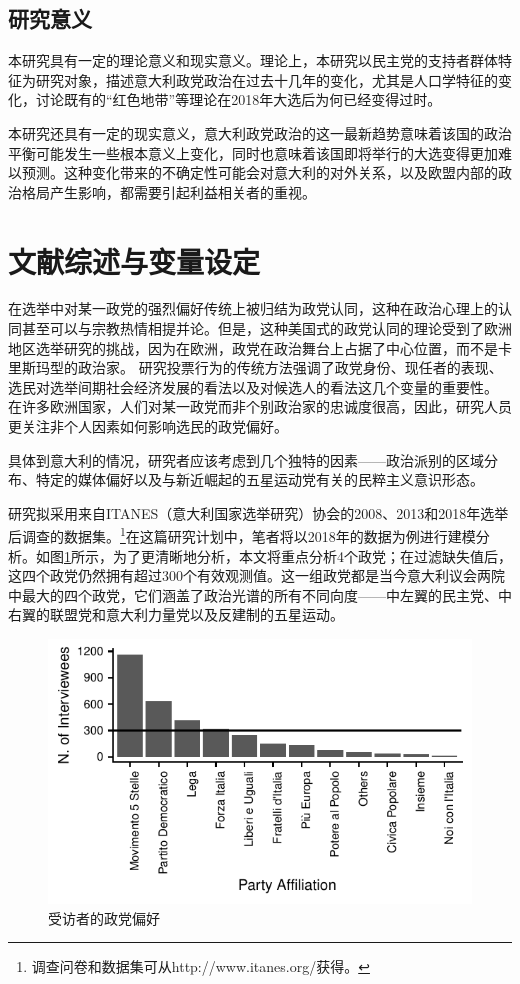 \documentclass[12pt,a4paper]{ctexart}
\begin{document}
    \subsection{研究意义}
    本研究具有一定的理论意义和现实意义。理论上，本研究以民主党的支持者群体特征为研究对象，描述意大利政党政治在过去十几年的变化，尤其是人口学特征的变化，讨论既有的``红色地带''等理论在2018年大选后为何已经变得过时。

    本研究还具有一定的现实意义，意大利政党政治的这一最新趋势意味着该国的政治平衡可能发生一些根本意义上变化，同时也意味着该国即将举行的大选变得更加难以预测。这种变化带来的不确定性可能会对意大利的对外关系，以及欧盟内部的政治格局产生影响，都需要引起利益相关者的重视。

    \section{文献综述与变量设定}

    在选举中对某一政党的强烈偏好传统上被归结为政党认同，这种在政治心理上的认同甚至可以与宗教热情相提并论。但是，这种美国式的政党认同的理论受到了欧洲地区选举研究的挑战，因为在欧洲，政党在政治舞台上占据了中心位置，而不是卡里斯玛型的政治家。
    \cite{berglund2005party}
    研究投票行为的传统方法强调了政党身份、现任者的表现、选民对选举间期社会经济发展的看法以及对候选人的看法这几个变量的重要性。
    \cite{fiorina1977outline}
    在许多欧洲国家，人们对某一政党而非个别政治家的忠诚度很高，因此，研究人员更关注非个人因素如何影响选民的政党偏好。

    具体到意大利的情况，研究者应该考虑到几个独特的因素——政治派别的区域分布、特定的媒体偏好以及与新近崛起的五星运动党有关的民粹主义意识形态。

    研究拟采用来自ITANES（意大利国家选举研究）协会的2008、2013和2018年选举后调查的数据集。\footnote{调查问卷和数据集可从http://www.itanes.org/获得。}在这篇研究计划中，笔者将以2018年的数据为例进行建模分析。如图\ref{num_survey}所示，为了更清晰地分析，本文将重点分析4个政党；在过滤缺失值后，这四个政党仍然拥有超过300个有效观测值。这一组政党都是当今意大利议会两院中最大的四个政党，它们涵盖了政治光谱的所有不同向度——中左翼的民主党、中右翼的联盟党和意大利力量党以及反建制的五星运动。

    \begin{figure}
        \centering
        \includegraphics[width=1\textwidth]{figure//unnamed-chunk-2-1.pdf}
        \caption{受访者的政党偏好}
        \label{num_survey}
    \end{figure}
\end{document}
